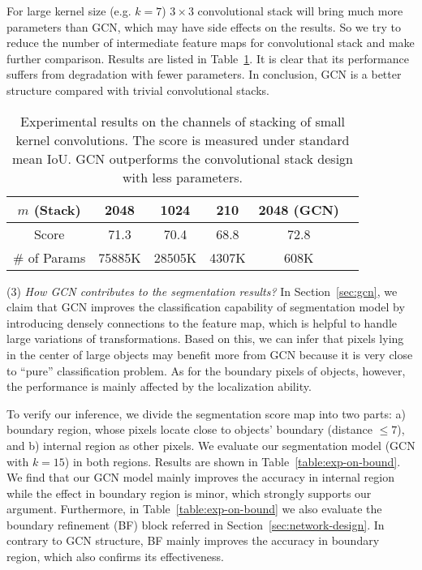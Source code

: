 \documentclass[10pt,twocolumn,letterpaper]{article}
\begin{document}
	For large kernel size (e.g. $k=7$) $3\times 3$ convolutional stack will bring much more parameters than GCN, which may have side effects on the results. So we try to reduce the number of intermediate feature maps for convolutional stack and make further comparison. Results are listed in Table~\ref{table:exp-on-stack-channels}. It is clear that its performance suffers from degradation with fewer parameters. In conclusion, GCN is a better structure compared with trivial convolutional stacks. 
	\begin{table}[h]
      \begin{center}
         \begin{tabular}{|c|c|c|c|c|c|}
         	\hline
         	$m$ (Stack) & 2048 & 1024 & 210 & 2048 (GCN) \\
         	\hline
         	Score & 71.3 & 70.4 & 68.8 & 72.8\\
         	\hline
         	\# of Params & 75885K & 28505K & 4307K & 608K \\
         	\hline
         \end{tabular}
      \end{center}
      \caption{Experimental results on the channels of stacking of small kernel convolutions.  The score is measured under standard mean IoU. GCN outperforms the convolutional stack design with less parameters. }
      \label{table:exp-on-stack-channels}
   \end{table}
\par
	(3)	\emph{How GCN contributes to the segmentation results?} In Section~\ref{sec:gcn}, we claim that GCN improves the classification capability of segmentation model by introducing densely connections to the feature map, which is helpful to handle large variations of transformations. Based on this, we can infer that pixels lying in the center of large objects may benefit more from GCN because it is very close to ``pure'' classification problem. As for the boundary pixels of objects, however, the performance is mainly affected by the localization ability.
\par
	To verify our inference, we divide the segmentation score map into two parts: a) boundary region, whose pixels locate close to objects' boundary (distance $\le 7$), and b) internal region as other pixels. We evaluate our segmentation model (GCN with $k=15$) in both regions. Results are shown in Table~\ref{table:exp-on-bound}. We find that our GCN model mainly improves the accuracy in internal region while the effect in boundary region is minor, which strongly supports our argument. Furthermore, in Table~\ref{table:exp-on-bound} we also evaluate the boundary refinement (BF) block referred in Section~\ref{sec:network-design}. In contrary to GCN structure, BF mainly improves the accuracy in boundary region, which also confirms its effectiveness.
\end{document}
